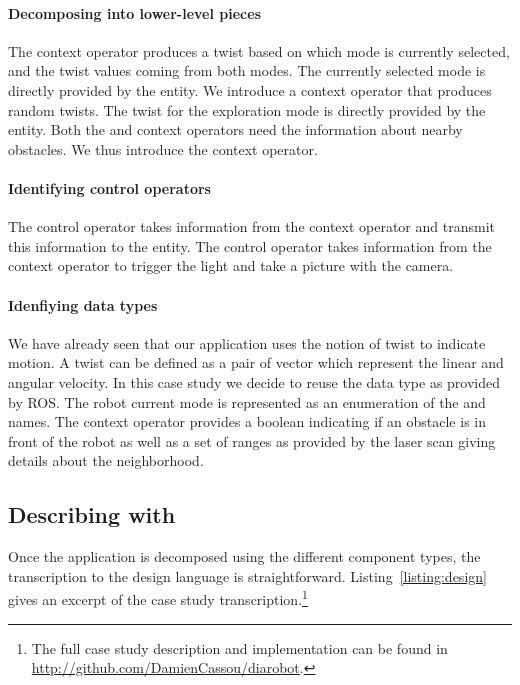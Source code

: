 \paragraph*{Decomposing into lower-level pieces}
The  context operator produces a twist based on which mode
is currently selected, and the twist values coming from both modes.
The currently selected mode is directly provided by the
 entity. We introduce a  context
operator that produces random twists. The twist for the exploration
mode is directly provided by the  entity. Both the
 and  context operators need the
information about nearby obstacles. We thus introduce the
 context operator.

\paragraph*{Identifying control operators}
The  control operator takes information from the
 context operator and transmit this information to the
 entity. The  control operator takes
information from the  context operator to trigger the
light and take a picture with the camera.

\paragraph*{Idenfiying data types}
We have already seen that our application uses the notion of twist to
indicate motion. A twist can be defined as a pair of vector which
represent the linear and angular velocity. In this case study we
decide to reuse the  data type as provided by ROS. The robot
current mode is represented as an enumeration of the  and
 names. The  context operator
provides a boolean indicating if an obstacle is in front of the robot
as well as a set of ranges as provided by the laser scan giving
details about the neighborhood.

\subsection{Describing with \diaspec{}}

Once the application is decomposed using the different component
types, the transcription to the \diaspec{} design language is
straightforward. Listing~\ref{listing:design} gives an excerpt of the
case study transcription.\footnote{The full case study description and
  implementation can be found in
  \url{http://github.com/DamienCassou/diarobot}.}


